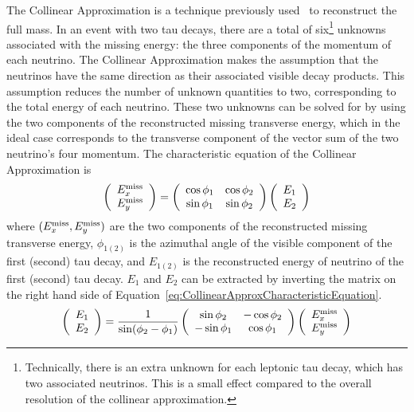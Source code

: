 The Collinear Approximation is a technique previously
used~\cite{Rainwater:1998kj} to reconstruct the full \TT mass.  In an
event with two tau decays, there are a total of six\footnote{Technically, there
is an extra unknown for each leptonic tau decay, which has two associated
neutrinos.  This is a small effect compared to the overall resolution of the
collinear approximation.} unknowns associated with the
missing energy: the three components of the momentum of each neutrino.  The
Collinear Approximation makes the assumption that the neutrinos have the same
direction as their associated visible decay products.  This assumption reduces
the number of unknown quantities to two, corresponding to the total energy of
each neutrino.  These two unknowns can be solved for by using the two components
of the reconstructed missing transverse energy, which in the ideal case
corresponds to the transverse component of the vector sum of the two neutrino's
four momentum.  The characteristic equation of the Collinear Approximation is 
\begin{equation}
  \left( \begin{array}{c} E_{x}^{\text{miss}} \\ E_{y}^{\text{miss}} \end{array} \right) = 
    \left( \begin{array}{cc} 
      \cos\phi_1 & \cos\phi_2 \\
      \sin\phi_1 & \sin\phi_2 
    \end{array} \right) 
    \left(\begin{array}{c} E_1 \\ E_2 \end{array} \right)
      \label{eq:CollinearApproxCharacteristicEquation}
\end{equation}
where $(E_{x}^{\text{miss}}, E_{y}^{\text{miss}})$ are the two components of the reconstructed missing
transverse energy, $\phi_{1(2)}$ is the azimuthal angle of the visible component
of the first (second) tau decay, and $E_{1(2)}$ is the reconstructed energy of
neutrino of the first (second) tau decay.  $E_1$ and $E_2$ can be extracted by
inverting the matrix on the right hand side of
Equation~\ref{eq:CollinearApproxCharacteristicEquation}.
\begin{equation}
  \left(\begin{array}{c} E_1 \\ E_2 \end{array} \right) = 
    \frac{1}{\sin(\phi_2 - \phi_1)} 
    \left( \begin{array}{cc} 
      \sin\phi_2 & -\cos\phi_2 \\
      -\sin\phi_1 & \cos\phi_1 
    \end{array} \right) 
  \left( \begin{array}{c} E_{x}^{\text{miss}} \\ E_{y}^{\text{miss}} \end{array} \right) 
    \label{eq:CollinearApproxInvertedEquation} 
\end{equation}

